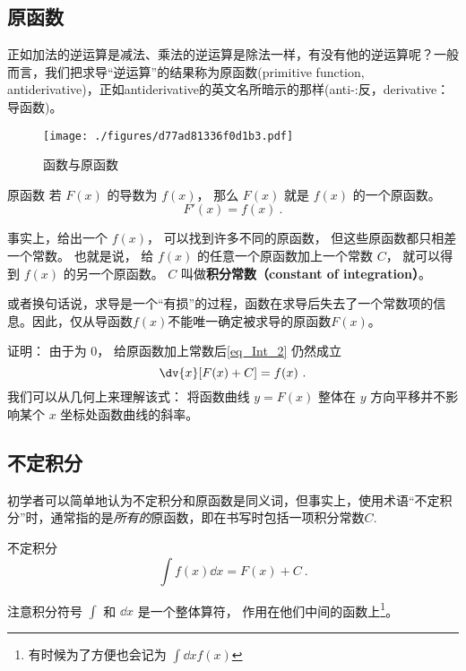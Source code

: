 
\subsection{原函数}
正如加法的逆运算是减法、乘法的逆运算是除法一样，有没有他的逆运算呢？一般而言，我们把求导“逆运算”的结果称为原函数(primitive function, antiderivative)，正如antiderivative的英文名所暗示的那样(anti-:反，derivative：导函数)。

\begin{figure}[ht]
\centering
\texttt{[image: ./figures/d77ad81336f0d1b3.pdf]}
\caption{函数与原函数} \label{fig_Int_1}
\end{figure}

\begin{definition}{原函数}
若 $F(x)$ 的导数为 $f(x)$， 那么 $F(x)$ 就是  $f(x)$ 的一个原函数。
\begin{equation}\label{eq_Int_2}
F'(x) = f(x)~.
\end{equation}
\end{definition}

\begin{theorem}{}
事实上，给出一个 $f(x)$， 可以找到许多不同的原函数， 但这些原函数都只相差一个常数。 也就是说， 给 $f(x)$ 的任意一个原函数加上一个常数 $C$， 就可以得到 $f(x)$ 的另一个原函数。 $C$ 叫做\textbf{积分常数（constant of integration）}。

或者换句话说，求导是一个“有损”的过程，函数在求导后失去了一个常数项的信息。因此，仅从导函数$f(x)$不能唯一确定被求导的原函数$F(x)$。
\end{theorem}

证明： 由于为 $0$， 给原函数加上常数后\autoref{eq_Int_2} 仍然成立
\begin{equation}\label{eq_Int_3}
\dv{x} [F(x) + C] = f(x)~.
\end{equation}
我们可以从几何上来理解该式： 将函数曲线 $y = F(x)$ 整体在 $y$ 方向平移并不影响某个 $x$ 坐标处函数曲线的斜率。

\subsection{不定积分}
初学者可以简单地认为不定积分和原函数是同义词，但事实上，使用术语“不定积分”时，通常指的是\textsl{所有的}原函数，即在书写时包括一项积分常数$C$.

\begin{definition}{不定积分}
\begin{equation}\label{eq_Int_1}
\int f(x) \dd{x} = F(x) + C~.
\end{equation}
\end{definition}
注意积分符号 $\int$ 和 $\dd{x}$ 是一个整体算符， 作用在他们中间的函数上\footnote{有时候为了方便也会记为 $\int\dd{x} f(x)$}。

